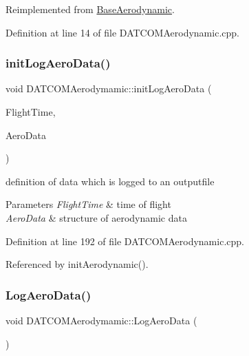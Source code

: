 Reimplemented from \hyperlink{class_base_aerodynamic_a6493b7d9c4cbadcbf3a8e5a6c973e1f3}{Base\+Aerodynamic}.



Definition at line 14 of file D\+A\+T\+C\+O\+M\+Aerodynamic.\+cpp.

\mbox{\label{class_d_a_t_c_o_m_aerodymamic_a5bf2796685504755b9d23cb8cfd90752}} 
\subsubsection{\texorpdfstring{init\+Log\+Aero\+Data()}{initLogAeroData()}}
{\footnotesize\ttfamily void D\+A\+T\+C\+O\+M\+Aerodymamic\+::init\+Log\+Aero\+Data (\begin{DoxyParamCaption}\item[{\hyperlink{group___tools_ga3f1431cb9f76da10f59246d1d743dc2c}{Float64} \&}]{Flight\+Time,  }\item[{Aerodynamic\+Struct \&}]{Aero\+Data }\end{DoxyParamCaption})\hspace{0.3cm}{\ttfamily [virtual]}}



definition of data which is logged to an outputfile 


\begin{DoxyParams}{Parameters}
{\em Flight\+Time} & time of flight \\
\hline
{\em Aero\+Data} & structure of aerodynamic data \\
\hline
\end{DoxyParams}


Definition at line 192 of file D\+A\+T\+C\+O\+M\+Aerodynamic.\+cpp.



Referenced by init\+Aerodynamic().

\mbox{\label{class_d_a_t_c_o_m_aerodymamic_a84ab90acbbec700e0b06272bf95cf932}} 
\subsubsection{\texorpdfstring{Log\+Aero\+Data()}{LogAeroData()}}
{\footnotesize\ttfamily void D\+A\+T\+C\+O\+M\+Aerodymamic\+::\+Log\+Aero\+Data (\begin{DoxyParamCaption}{ }\end{DoxyParamCaption})\hspace{0.3cm}{\ttfamily [virtual]}}



